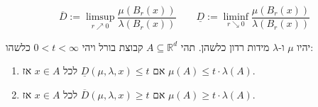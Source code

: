 \documentclass{tstextbook}
\begin{document}
\begin{reminder}
$$\overline{D}:= \limsup_{ r \nearrow 0 } \frac{\mu(B_{r}(x))}{\lambda(B_{r}(x))}\qquad \underline{D}:= \liminf_{ r \searrow 0 } \frac{\mu(B_{r}(x))}{\lambda(B_{r}(x))}$$

\end{reminder}
\begin{proposition}
יהיו \(\mu\) ו-\(\lambda\) מידות רדון כלשהן. תהי \(A \subseteq \mathbb{R}^d\) קבוצת בורל ויהי \(0 < t < \infty\) כלשהו:

  \begin{enumerate}
    \item אם \(\underline{D}(\mu, \lambda, x) \leq t\) לכל \(x \in A\) אז \(\mu(A) \leq t \cdot \lambda(A)\). 


    \item אם \(\overline{D}(\mu, \lambda, x) \geq t\) לכל \(x \in A\) אז \(\mu(A) \geq t \cdot \lambda(A)\). 


  \end{enumerate}
\end{proposition}
\end{document}
